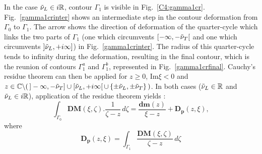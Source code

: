 In the case $\tilde{\nu}_L \in i\mathbb{R}$, contour $\Gamma_1$ is visible in Fig.~\ref{C4:gamma1cr}. Fig.~\ref{gamma1crinter} shows an intermediate step in the contour deformation from $\Gamma_0$ to $\Gamma_1$. The arrow shows the direction of deformation of the quarter-cycle which links the two parts of $\Gamma_1$ (one which circumvents $\lbrack-\infty,-\tilde{\nu}_T\lbrack$ and one which circumvents $\rbrack \tilde{\nu}_L, +i\infty\rbrack $) in Fig.~\ref{gamma1crinter}. The radius of this quarter-cycle tends to infinity during the deformation, resulting in the final contour, which is the reunion of contours $\Gamma_1^a$ and $\Gamma_1^b$, represented in Fig.~\ref{gamma1crfinal}. Cauchy's residue theorem can then be applied for $z\geq 0$, Im$\xi <0 $ and $ z\in \mathbb{C} \backslash ( \, \rbrack - \infty, -\tilde{\nu}_T \rbrack \cup \lbrack \tilde{\nu}_L,+i\infty \lbrack \, \cup \, \{\pm \tilde{\nu}_L,\pm \tilde{\nu}_T \} \,)$. In both cases ($\tilde{\nu}_L \in \mathbb{R}$ and $\tilde{\nu}_L \in i\mathbb{R}$), application of the residue theorem yields :
\begin{equation}
\int_{\Gamma_0} \textbf{DM}(\xi,\zeta).\frac{1}{\zeta-z}\,d\zeta = \frac{\textbf{dm}(z)}{\xi-z}+\mathbf{D_p}(z,\xi),
\label{C4:GaussDM}
\end{equation}
where
\begin{equation}
\mathbf{D_p}(z,\xi)= \int_{\Gamma_1} \frac{\textbf{DM}(\xi,\zeta)}{\zeta-z}\,d\zeta
\label{C4:defDp}
\end{equation}

